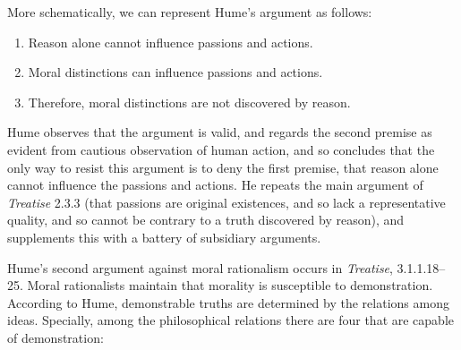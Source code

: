 More schematically, we can represent Hume's argument as follows:

\begin{enumerate}
    \item Reason alone cannot influence passions and actions.
    \item Moral distinctions can influence passions and actions.
    \item Therefore, moral distinctions are not discovered by reason.
\end{enumerate}

Hume observes that the argument is valid, and regards the second premise as evident from cautious observation of human action, and so concludes that the only way to resist this argument is to deny the first premise, that reason alone cannot influence the passions and actions. He repeats the main argument of \emph{Treatise} 2.3.3 (that passions are original existences, and so lack a representative quality, and so cannot be contrary to a truth discovered by reason), and supplements this with a battery of subsidiary arguments. \change

% 


Hume's second argument against moral rationalism occurs in \emph{Treatise}, 3.1.1.18--25. Moral rationalists maintain that morality is susceptible to demonstration. According to Hume, demonstrable truths are determined by the relations among ideas. Specially, among the philosophical relations there are four that are capable of demonstration:

